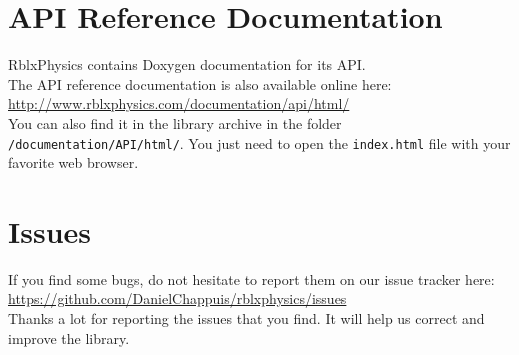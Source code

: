\documentclass[a4paper,12pt]{article}
\begin{document}
   \section{API Reference Documentation}

   RblxPhysics contains Doxygen documentation for its API. \\

   The API reference documentation is also available online here: \url{http://www.rblxphysics.com/documentation/api/html/} \\

   You can also find it in the library archive in the folder \texttt{/documentation/API/html/}. You just
   need to open the \texttt{index.html} file with your favorite web browser. 

   \section{Issues}

   If you find some bugs, do not hesitate to report them on our issue tracker here: \\

   \url{https://github.com/DanielChappuis/rblxphysics/issues} \\

   Thanks a lot for reporting the issues that you find. It will help us correct and improve the library.
\end{document}
